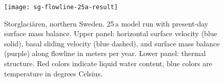 \begin{figure}[ht]
  \centering
  \texttt{[image: sg-flowline-25a-result]}
  \caption{Storglaci{\"a}ren, northern Sweden. 25\,a model run with present-day surface mass balance. Upper panel: horizontal surface velocity (blue solid), basal sliding velocity (blue dashed), and surface mass balance (purple) along flowline in meters per year. Lower panel: thermal structure. Red colors indicate liquid water content, blue colors are temperature in degrees Celsius.}
  \label{fig:storglaciaren-25a-result}
\end{figure}
